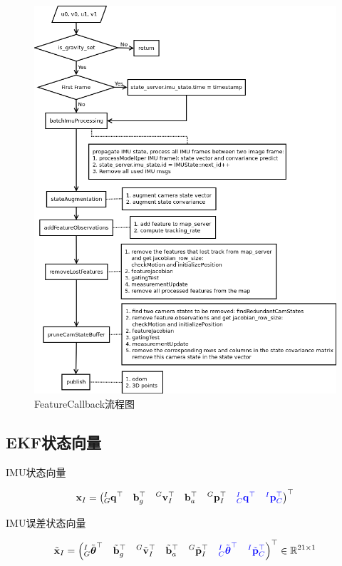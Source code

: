 \documentclass[12pt,a4paper]{article}
\begin{document}
\begin{figure}[htbp]
\centering
\includegraphics[scale=0.7]{images/feature_cb.png}
\caption{FeatureCallback流程图}
\end{figure}

\newpage
\subsection{EKF状态向量}

IMU状态向量

\begin{equation*}
\mathbf{x}_{I} = 
\left(
{}^I_G \mathbf{q}^\top \quad 
\mathbf{b}_g^\top \quad 
{}^G\mathbf{v}^\top_I \quad 
\mathbf{b}_a^\top \quad
{}^G\mathbf{p}^\top_I \quad
{\color{blue}
{}^I_C \mathbf{q}^\top \quad
{}^I\mathbf{p}^\top_C}
\right)^\top
\end{equation*}

IMU误差状态向量

\begin{equation*}
\tilde{\mathbf{x}}_{I} = 
\left(
{}^I_G \tilde{\boldsymbol{\theta}}^\top \quad 
\tilde{\mathbf{b}}_g^\top \quad 
{}^G\tilde{\mathbf{v}}^\top_I \quad 
\tilde{\mathbf{b}}_a^\top \quad
{}^G\tilde{\mathbf{p}}^\top_I \quad
{\color{blue}
{}^I_C \tilde{\boldsymbol{\theta}}^\top \quad
{}^I\tilde{\mathbf{p}}^\top_C}
\right)^\top 
\in \mathbb{R}^{21 \times 1}
\end{equation*}
\end{document}
